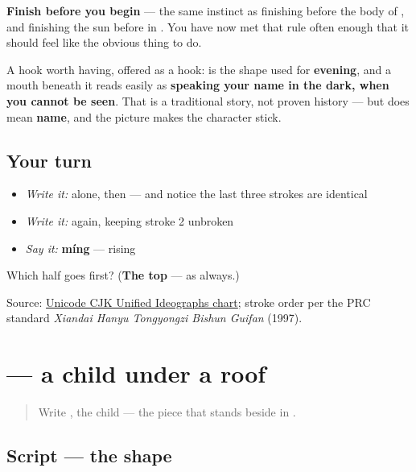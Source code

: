 \textbf{Finish  before you begin } — the same instinct as finishing  before the body of , and finishing the sun before  in . You have now met that rule often enough that it should feel like the obvious thing to do.

A hook worth having, offered as a hook:  is the shape used for \textbf{evening}, and a mouth beneath it reads easily as \textbf{speaking your name in the dark, when you cannot be seen}. That is a traditional story, not proven history — but  does mean \textbf{name}, and the picture makes the character stick.

\subsection*{Your turn}
\begin{itemize}
\raggedright
  \item \emph{Write it:}  alone, then  — and notice the last three strokes are identical
  \item \emph{Write it:}  again, keeping stroke 2 unbroken
  \item \emph{Say it:} \textbf{míng} — rising
\end{itemize}

\begin{tcolorbox}[breakable,colback=teal!4,colframe=teal!35!black,title={Before you move on}]
Which half goes first? (\textbf{The top} — as always.)

Source: \href{https://www.unicode.org/charts/PDF/U4E00.pdf}{Unicode CJK Unified Ideographs chart}; stroke order per the PRC standard \emph{Xiandai Hanyu Tongyongzi Bishun Guifan} (1997).
\end{tcolorbox}
\section[\texorpdfstring{\zh{字} (zì)}{字 (zì)}]{ — a child under a roof}

\label{lesson:ZH-W08-zi}



\begin{quote}
Write , the child — the piece that stands beside  in .
\end{quote}

\subsection*{Script — the shape}

